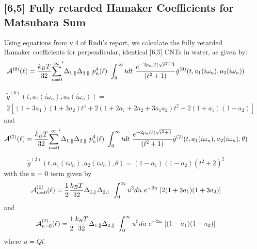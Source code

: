 \documentclass[a4paper]{article}
\begin{document}
\subsection{[6,5] Fully retarded Hamaker Coefficients for Matsubara Sum }
\begin{center}
Using equations from v.4 of Rudi's report, we calculate the fully retarded\\ 
Hamaker coefficients for perpendicular, identical [6,5] CNTs in water, as given
by:
\begin{equation}
{\cal A}^{(0)}(\ell) = \frac{k_BT}{32}  {\sum_{n=0}^{\infty}}' \Delta_{1,\parallel} \Delta_{2,\parallel} ~p_n^{4}(\ell) ~\int_0^{\infty} t dt ~\frac{e^{- 2 p_n(\ell) \sqrt{t^{2} + 1}}}{(t^{2} + 1)} \tilde g^{(0)}(t, a_1(i \omega_n), a_2(i \omega_n))
\end{equation}

\begin{multline*}
\tilde g^{(0)}(t, a_1(i \omega_n), a_2(i \omega_n)) = \\ 
2 \left[ (1+3a_1)(1+3a_2) t^{4} + 2 (1+2a_1+2a_2+3a_1a_2) t^{2}  + 2(1+a_1)(1+a_2)\right]
\end{multline*}
and
\begin{equation}
{\cal A}^{(2)}(\ell) = \frac{k_BT}{32}  {\sum_{n=0}^{\infty}}' \Delta_{1,\parallel} \Delta_{2,\parallel} ~p_n^{4}(\ell) ~\int_0^{\infty} t dt ~\frac{e^{- 2 p_n(\ell) \sqrt{t^{2} + 1}}}{(t^{2} + 1)} \tilde g^{(2)}(t, a_1(i \omega_n), a_2(i \omega_n), \theta)
\end{equation}

\begin{equation}
\tilde g^{(2)}(t, a_1(i \omega_n), a_2(i \omega_n), \theta) = (1-a_1)(1-a_2)(t^{2} + 2)^2
\label{befgqw}
\end{equation}
with the n = 0 term given by
\begin{equation}
    {\cal A}_{n=0}^{(0)}(\ell) = \frac{1}{2} \frac{k_BT}{32}
    \Delta_{1,\parallel} \Delta_{2,\parallel} ~\int_0^{\infty} u^3 du\,\,
    e^{-2u}\,\,[2(1 + 3a_1)(1 + 3a_2) ]
\end{equation}
and
\begin{equation}
    {\cal A}_{n=0}^{(2)}(\ell) = \frac{1}{2} \frac{k_BT}{32}
    \Delta_{1,\parallel} \Delta_{2,\parallel} ~\int_0^{\infty} u^3 du\,\,
    e^{-2u}\,\,[(1 - a_1)(1 - a_2) ]
\end{equation}
where $u = Ql$.


\end{center}
\end{document}

